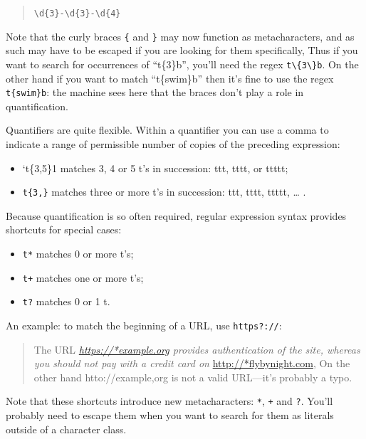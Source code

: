 \documentclass[]{book}
\providecommand{\tightlist}{%
  \setlength{\itemsep}{0pt}\setlength{\parskip}{0pt}}
\theoremstyle{definition}
\theoremstyle{definition}
\theoremstyle{remark}
\begin{document}
{\begin{quote}
\texttt{\textbackslash{}d\{3\}-\textbackslash{}d\{3\}-\textbackslash{}d\{4\}}
\end{quote}

Note that the curly braces \texttt{\{} and \texttt{\}} may now function
as metacharacters, and as such may have to be escaped if you are looking
for them specifically, Thus if you want to search for occurrences of
``t\{3\}b'', you'll need the regex
\texttt{t\textbackslash{}\{3\textbackslash{}\}b}. On the other hand if
you want to match ``t\{swim\}b'' then it's fine to use the regex
\texttt{t\{swim\}b}: the machine sees here that the braces don't play a
role in quantification.

Quantifiers are quite flexible. Within a quantifier you can use a comma
to indicate a range of permissible number of copies of the preceding
expression:

\begin{itemize}
\tightlist
\item
  `t\{3,5\}1 matches 3, 4 or 5 t's in succession: ttt, tttt, or ttttt;
\item
  \texttt{t\{3,\}} matches three or more t's in succession: ttt, tttt,
  ttttt, \ldots{} .
\end{itemize}

Because quantification is so often required, regular expression syntax
provides shortcuts for special cases:

\begin{itemize}
\tightlist
\item
  \texttt{t*} matches 0 or more t's;
\item
  \texttt{t+} matches one or more t's;
\item
  \texttt{t?} matches 0 or 1 t.
\end{itemize}

An example: to match the beginning of a URL, use \texttt{https?://}:

\begin{quote}
The URL \emph{\url{https://*example.org} provides authentication of the
site, whereas you should not pay with a credit card on
}\url{http://*flybynight.com}, On the other hand htto://example,org is
not a valid URL---it's probably a typo.
\end{quote}

Note that these shortcuts introduce new metacharacters: \texttt{*},
\texttt{+} and \texttt{?}. You'll probably need to escape them when you
want to search for them as literals outside of a character class.

}
\end{document}
